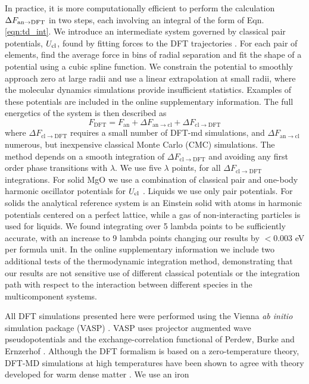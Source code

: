 In practice, it is more computationally efficient to perform the calculation $\Delta
F_{\rm an\to DFT}$ in two steps, each involving an integral of the form of Eqn.
\ref{eqn:td_int}. We introduce an intermediate system governed by classical pair
potentials, $U_{\rm cl}$, found by fitting forces to the DFT trajectories
\citep{Wilson2010,Izvekov2004}. For each pair of elements, find the average force in bins
of radial separation and fit the shape of a potential using a cubic spline function. We
constrain the potential to smoothly approach zero at large radii and use a linear
extrapolation at small radii, where the molecular dynamics simulations provide
insufficient statistics. Examples of these potentials are included in the online
supplementary information. The full energetics of the system is then described as
\begin{equation} \label{eqn:two_step}
F_{\mathrm{DFT}}=F_{\mathrm{\mathrm{an}}}+\Delta
F_{\mathrm{an} \to \mathrm{cl}}+\Delta F_{\mathrm{cl}\to \mathrm{DFT}}
\end{equation}
where $\Delta F_{\mathrm{cl}\to \mathrm{DFT}}$ requires a small number of DFT-md
simulations, and $\Delta F_{\mathrm{an} \to \mathrm{cl}}$ numerous, but inexpensive
classical Monte Carlo (CMC) simulations. The method depends on a smooth integration of
$\Delta F_{\mathrm{cl}\to \mathrm{DFT}}$ and avoiding any first order phase transitions
with $\lambda$.  We use five $\lambda$ points, for all $\Delta F_{\mathrm{cl}\to
\mathrm{DFT}}$ integrations. For solid MgO we use a combination of classical pair and
one-body harmonic oscillator potentials for $U_{\rm cl}$ \citep{Wilson2012a,Wahl2013}.
Liquids we use only pair potentials. For solids the analytical reference system is an
Einstein solid with atoms in harmonic potentials centered on a perfect lattice, while a
gas of non-interacting particles is used for liquids. We found integrating over 5 lambda
points to be sufficiently accurate, with an increase to 9 lambda points changing our
results by $<0.003$ eV per formula unit. In the online supplementary information we
include two additional tests of the thermodynamic integration method, demonstrating that
our results are not sensitive use of different classical potentials or the integration
path with respect to the interaction between different species in the multicomponent
systems.

All DFT simulations presented here were performed using the Vienna {\it ab initio}
simulation package (VASP) \citep{Kresse1996}. VASP uses projector augmented wave
pseudopotentials \citep{Blochl1994} and the exchange-correlation functional of Perdew,
Burke and Ernzerhof \citep{Perdew1996}. Although the DFT formalism is based on a
zero-temperature theory, DFT-MD simulations at high temperatures have been shown to agree
with theory developed for warm dense matter \citep{Driver2012}. We use an iron

